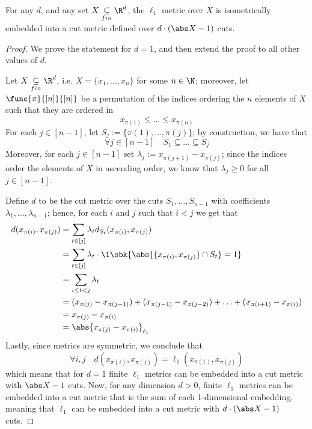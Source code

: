\documentclass[a4paper, 12pt]{report}
\begin{document}
    \begin{framedlem}[label={metric lemma}]{}
        For any $d$, and any set $X \underset{fin}{\subseteq} \R^d$, the $\ell_1$ metric over $X$ is isometrically embedded into a cut metric defined over $d \cdot(\abs X - 1)$ cuts.
    \end{framedlem}

    \begin{proof}
        We prove the statement for $d =1$, and then extend the proof to all other values of $d$.

        Let $X \underset{fin}{\subseteq} \R^d$, i.e. $X = \{x_1, \ldots, x_n\}$ for some $n \in \N$; moreover, let $\func{\pi}{[n]}{[n]}$ be a permutation of the indices ordering the $n$ elements of $X$ such that they are ordered in  $$x_{\pi(1)} \le \ldots \le x_{\pi(n)}$$ For each $j \in [n - 1]$, let $S_j := \{\pi(1), \ldots, \pi(j)\}$; by construction, we have that $$\forall j \in [n - 1] \quad S_1 \subseteq \ldots \subseteq S_j$$ Moreover, for each $j \in [n - 1]$ set $\lambda_j := x_{\pi(j + 1)} - x_{\pi(j)}$; since the indices order the elements of $X$ in ascending order, we know that $\lambda_j \ge 0$ for all $j \in [n - 1]$.

        Define $d$ to be the cut metric over the cuts $S_1, \ldots, S_{n - 1}$ with coefficients $\lambda_1, \ldots, \lambda_{n - 1}$; hence, for each $i$ and $j$ such that $i < j$ we get that
        \begin{equation*}
            \begin{split}
                d(x_{\pi(i)}, x_{\pi(j)}) &= \sum_{t \in [j]}{\lambda_t d_{S_t}(x_{\pi(i)}, x_{\pi(j)})} \\
                                          &= \sum_{t \in [j]}{\lambda_t \cdot \1 \sbk{\abs{\{x_{\pi(i)}, x_{\pi(j)}\} \cap S_t} = 1}} \\
                                          &= \sum_{i \le t < j}{\lambda_t} \\
                                          &= (x_{\pi(j)} - x_{\pi(j - 1)}) + (x_{\pi(j - 1)} - x_{\pi(j - 2)}) + \ldots + (x_{\pi(i + 1)} - x_{\pi(i)}) \\
                                          &= x_{\pi(j)} - x_{\pi(i)} \\
                                          &= \abs{x_{\pi(j)} - x_{\pi(i)}}_{\ell_1}
            \end{split}
        \end{equation*}
        Lastly, since metrics are symmetric, we conclude that $$\forall i,j \quad d(x_{\pi(i)}, x_{\pi(j)}) = \ell_1(x_{\pi(1)}, x_{\pi(j)})$$ which means that for $d=1$ finite $\ell_1$ metrics can be embedded into a cut metric with $\abs X - 1$ cuts. Now, for any dimension $d > 0$, finite $\ell_1$ metrics can be embedded into a cut metric that is the sum of each 1-dimensional embedding, meaning that $\ell_1$ can be embedded into a cut metric with $d \cdot(\abs X - 1)$ cuts.
    \end{proof}
\end{document}
